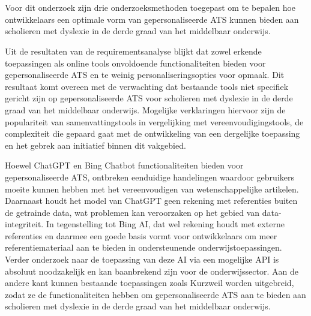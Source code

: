 
\chapter{}%
\label{ch:discussie}




Voor dit onderzoek zijn drie onderzoeksmethoden toegepast om te bepalen hoe ontwikkelaars een optimale vorm van gepersonaliseerde ATS kunnen bieden aan scholieren met dyslexie in de derde graad van het middelbaar onderwijs.

\medspace

Uit de resultaten van de requirementsanalyse blijkt dat zowel erkende toepassingen als online tools onvoldoende functionaliteiten bieden voor gepersonaliseerde ATS en te weinig personaliseringsopties voor opmaak. Dit resultaat komt overeen met de verwachting dat bestaande tools niet specifiek gericht zijn op gepersonaliseerde ATS voor scholieren met dyslexie in de derde graad van het middelbaar onderwijs. Mogelijke verklaringen hiervoor zijn de populariteit van samenvattingstools in vergelijking met vereenvoudigingstools, de complexiteit die gepaard gaat met de ontwikkeling van een dergelijke toepassing en het gebrek aan initiatief binnen dit vakgebied.

Hoewel ChatGPT en Bing Chatbot functionaliteiten bieden voor gepersonaliseerde ATS, ontbreken eenduidige handelingen waardoor gebruikers moeite kunnen hebben met het vereenvoudigen van wetenschappelijke artikelen. Daarnaast houdt het model van ChatGPT geen rekening met referenties buiten de getrainde data, wat problemen kan veroorzaken op het gebied van data-integriteit. In tegenstelling tot Bing AI, dat wel rekening houdt met externe referenties en daarmee een goede basis vormt voor ontwikkelaars om meer referentiemateriaal aan te bieden in ondersteunende onderwijstoepassingen. Verder onderzoek naar de toepassing van deze AI via een mogelijke API is absoluut noodzakelijk en kan baanbrekend zijn voor de onderwijssector. Aan de andere kant kunnen bestaande toepassingen zoals Kurzweil worden uitgebreid, zodat ze de functionaliteiten hebben om gepersonaliseerde ATS aan te bieden aan scholieren met dyslexie in de derde graad van het middelbaar onderwijs.

